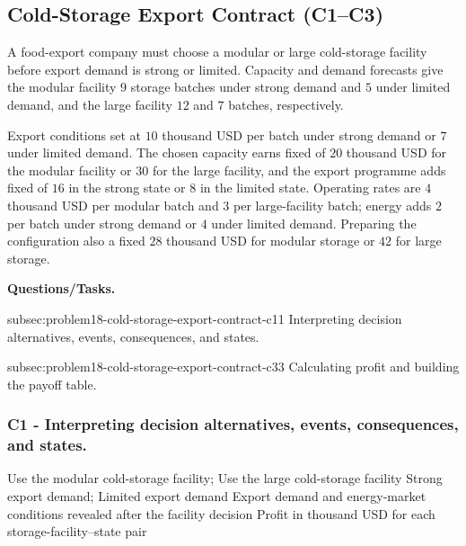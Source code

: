 	\subsection{Cold-Storage Export Contract (C1--C3)}
	\label{sec:problem18-cold-storage-export-contract-c1-c3}

	A food-export company must choose a modular or large cold-storage facility before export demand is strong or limited. Capacity and demand forecasts give the modular facility \(9\) storage batches under strong demand and \(5\) under limited demand, and the large facility \(12\) and \(7\) batches, respectively.

	Export conditions set  at \(10\) thousand USD per batch under strong demand or \(7\) under limited demand. The chosen capacity earns fixed  of \(20\) thousand USD for the modular facility or \(30\) for the large facility, and the export programme adds fixed  of \(16\) in the strong state or \(8\) in the limited state. Operating rates are \(4\) thousand USD per modular batch and \(3\) per large-facility batch; energy adds \(2\) per batch under strong demand or \(4\) under limited demand. Preparing the configuration also  a fixed \(28\) thousand USD for modular storage or \(42\) for large storage.

	\textbf{Questions/Tasks.}
	\begin{enumerate}
		\CriterionTask
		{subsec:problem18-cold-storage-export-contract-c1}{1}
		{Interpreting decision alternatives, events, consequences, and states.}

		\CriterionTask
		{subsec:problem18-cold-storage-export-contract-c3}{3}
		{Calculating profit and building the payoff table.}
	\end{enumerate}

	\subsubsection*{C1 - Interpreting decision alternatives, events, consequences, and states.}
	\label{subsec:problem18-cold-storage-export-contract-c1}

	\DecisionElementsTable
	{Use the modular cold-storage facility; Use the large cold-storage facility}
	{Strong export demand; Limited export demand}
	{Export demand and energy-market conditions revealed after the facility decision}
	{Profit in thousand USD for each storage-facility--state pair}

